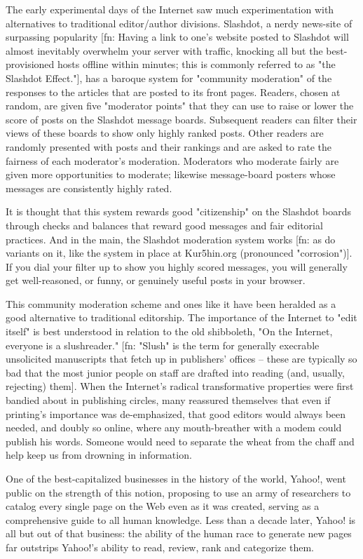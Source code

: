 The early experimental days of the Internet saw much
experimentation with alternatives to traditional editor/author
divisions. Slashdot, a nerdy news-site of surpassing popularity
[fn: Having a link to one's website posted to Slashdot will almost
inevitably overwhelm your server with traffic, knocking all but the
best-provisioned hosts offline within minutes; this is commonly
referred to as "the Slashdot Effect."], has a baroque system for
"community moderation" of the responses to the articles that are
posted to its front pages. Readers, chosen at random, are given
five "moderator points" that they can use to raise or lower the
score of posts on the Slashdot message boards. Subsequent readers
can filter their views of these boards to show only highly ranked
posts. Other readers are randomly presented with posts and their
rankings and are asked to rate the fairness of each moderator's
moderation. Moderators who moderate fairly are given more
opportunities to moderate; likewise message-board posters whose
messages are consistently highly rated.

It is thought that this system rewards good "citizenship" on the
Slashdot boards through checks and balances that reward good
messages and fair editorial practices. And in the main, the
Slashdot moderation system works [fn: as do variants on it, like
the system in place at Kur5hin.org (pronounced "corrosion")]. If
you dial your filter up to show you highly scored messages, you
will generally get well-reasoned, or funny, or genuinely useful
posts in your browser.

This community moderation scheme and ones like it have been
heralded as a good alternative to traditional editorship. The
importance of the Internet to "edit itself" is best understood in
relation to the old shibboleth, "On the Internet, everyone is a
slushreader." [fn: "Slush" is the term for generally execrable
unsolicited manuscripts that fetch up in publishers' offices --
these are typically so bad that the most junior people on staff are
drafted into reading (and, usually, rejecting) them]. When the
Internet's radical transformative properties were first bandied
about in publishing circles, many reassured themselves that even if
printing's importance was de-emphasized, that good editors would
always been needed, and doubly so online, where any mouth-breather
with a modem could publish his words. Someone would need to
separate the wheat from the chaff and help keep us from drowning in
information.

One of the best-capitalized businesses in the history of the world,
Yahoo!, went public on the strength of this notion, proposing to
use an army of researchers to catalog every single page on the Web
even as it was created, serving as a comprehensive guide to all
human knowledge. Less than a decade later, Yahoo! is all but out of
that business: the ability of the human race to generate new pages
far outstrips Yahoo!'s ability to read, review, rank and categorize
them.

